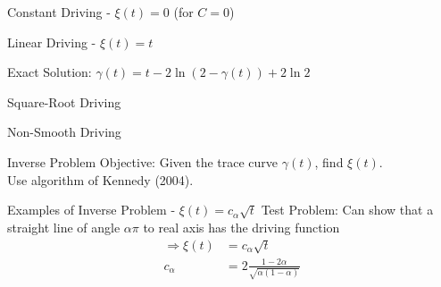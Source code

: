 \documentclass{beamer}
\begin{document}
\begin{frame}{Constant Driving - $\xi(t) = 0$ (for $C=0$)}
\begin{adjustbox}{max totalsize={\textwidth}{\textheight}}

\end{adjustbox}
\end{frame}

\begin{frame}{Linear Driving - $\xi(t) = t$}
\begin{adjustbox}{max totalsize={\textwidth}{0.7\textheight}}

\end{adjustbox}
    Exact Solution: $\gamma(t) = t - 2 \ln ( 2 - \gamma(t) ) + 2 \ln 2$
\end{frame}

\begin{frame}{Square-Root Driving}
\begin{adjustbox}{max totalsize={\textwidth}{\textheight}}

\end{adjustbox}
\end{frame}

\begin{frame}{Non-Smooth Driving}
\begin{adjustbox}{max totalsize={\textwidth}{\textheight}}

\end{adjustbox}
\end{frame}

\begin{frame}{Inverse Problem}
    Objective: Given the trace curve $\gamma(t)$, find $\xi(t)$. \\[10pt]
\begin{adjustbox}{max totalsize={\textwidth}{\textheight}}

\end{adjustbox}
Use algorithm of Kennedy (2004).
\end{frame}

\begin{frame}{Examples of Inverse Problem - $\xi(t) = c_\alpha \sqrt{t}$}
Test Problem: Can show that a straight line of angle $\alpha \pi$ to real axis has the driving function
\begin{align*}
    \Rightarrow \xi(t) &= c_\alpha \sqrt{t} \\
    c_\alpha &= 2\frac{1-2\alpha}{\sqrt{\alpha(1 - \alpha)}}
\end{align*}
\begin{adjustbox}{max totalsize={\textwidth}{\textheight}}

\end{adjustbox}
\end{frame}
\end{document}
